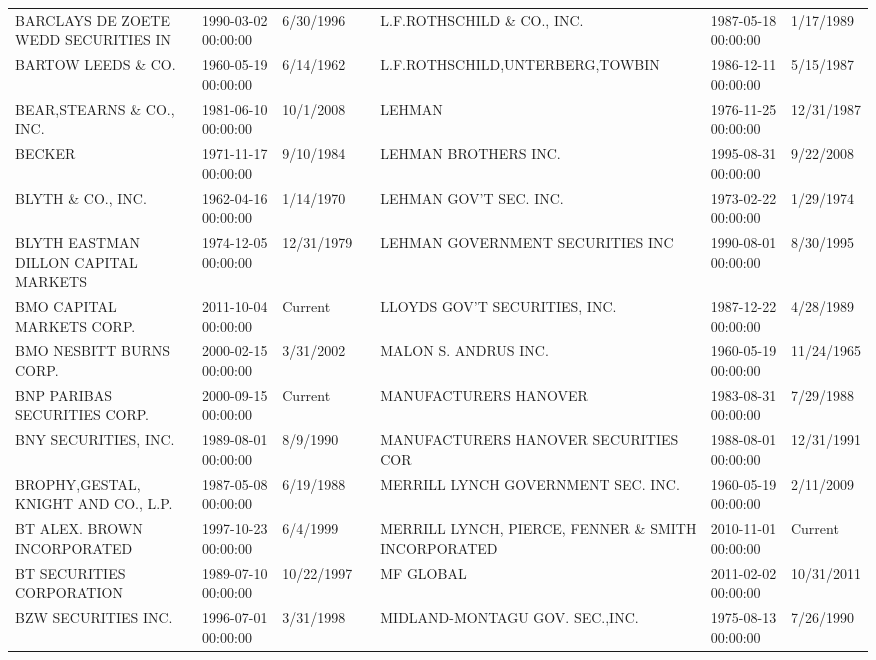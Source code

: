 \begin{tabular}{lllllll}
BARCLAYS DE ZOETE WEDD SECURITIES IN & 1990-03-02 00:00:00 & 6/30/1996 &  & L.F.ROTHSCHILD \& CO., INC.      & 1987-05-18 00:00:00 & 1/17/1989 \\
BARTOW LEEDS \& CO.                   & 1960-05-19 00:00:00 & 6/14/1962 &  & L.F.ROTHSCHILD,UNTERBERG,TOWBIN & 1986-12-11 00:00:00 & 5/15/1987 \\
BEAR,STEARNS \& CO., INC.            & 1981-06-10 00:00:00 & 10/1/2008 &  & LEHMAN                               & 1976-11-25 00:00:00 & 12/31/1987 \\
BECKER                               & 1971-11-17 00:00:00 & 9/10/1984 &  & LEHMAN BROTHERS INC.                 & 1995-08-31 00:00:00 & 9/22/2008 \\
BLYTH \& CO., INC.                    & 1962-04-16 00:00:00 & 1/14/1970 &  & LEHMAN GOV'T SEC. INC.               & 1973-02-22 00:00:00 & 1/29/1974 \\
BLYTH EASTMAN DILLON CAPITAL MARKETS & 1974-12-05 00:00:00 & 12/31/1979 &  & LEHMAN GOVERNMENT SECURITIES INC     & 1990-08-01 00:00:00 & 8/30/1995 \\
BMO CAPITAL MARKETS CORP.  & 2011-10-04 00:00:00 & Current &  & LLOYDS GOV'T SECURITIES, INC.       & 1987-12-22 00:00:00 & 4/28/1989 \\
BMO NESBITT BURNS CORP.             & 2000-02-15 00:00:00 & 3/31/2002 &  & MALON S. ANDRUS INC.                 & 1960-05-19 00:00:00 & 11/24/1965 \\
BNP PARIBAS SECURITIES CORP.         & 2000-09-15 00:00:00 & Current &  & MANUFACTURERS HANOVER                & 1983-08-31 00:00:00 & 7/29/1988 \\
BNY SECURITIES, INC.                 & 1989-08-01 00:00:00 & 8/9/1990 &  & MANUFACTURERS HANOVER SECURITIES COR & 1988-08-01 00:00:00 & 12/31/1991 \\
BROPHY,GESTAL, KNIGHT AND CO., L.P. & 1987-05-08 00:00:00 & 6/19/1988 &  & MERRILL LYNCH GOVERNMENT SEC. INC.  & 1960-05-19 00:00:00 & 2/11/2009 \\
BT ALEX. BROWN INCORPORATED          & 1997-10-23 00:00:00 & 6/4/1999 &  & MERRILL LYNCH, PIERCE, FENNER \& SMITH INCORPORATED & 2010-11-01 00:00:00 & Current \\
BT SECURITIES CORPORATION            & 1989-07-10 00:00:00 & 10/22/1997 &  & MF GLOBAL  & 2011-02-02 00:00:00 & 10/31/2011 \\
BZW SECURITIES INC.                  & 1996-07-01 00:00:00 & 3/31/1998 &  & MIDLAND-MONTAGU GOV. SEC.,INC.  & 1975-08-13 00:00:00 & 7/26/1990 \\

\end{tabular}
